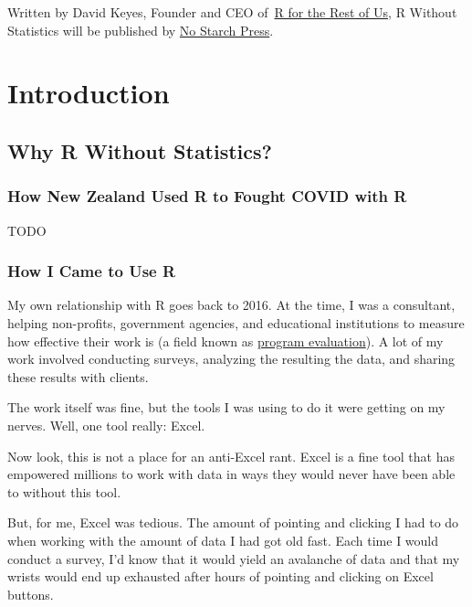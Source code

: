 \documentclass[
]{book}
\begin{document}
Written by David Keyes, Founder and CEO of~\href{https://rfortherestofus.com/}{R for the Rest of Us}, R Without Statistics will be published by \href{https://nostarch.com/}{No Starch Press}.

\hypertarget{part-introduction}{%
\part*{Introduction}\label{part-introduction}}

\hypertarget{why-r-without-statistics}{%
\chapter*{Why R Without Statistics?}\label{why-r-without-statistics}}

\hypertarget{how-new-zealand-used-r-to-fought-covid-with-r}{%
\section*{How New Zealand Used R to Fought COVID with R}\label{how-new-zealand-used-r-to-fought-covid-with-r}}

TODO

\hypertarget{how-i-came-to-use-r}{%
\section*{How I Came to Use R}\label{how-i-came-to-use-r}}

My own relationship with R goes back to 2016. At the time, I was a consultant, helping non-profits, government agencies, and educational institutions to measure how effective their work is (a field known as \href{https://www.cdc.gov/evaluation/index.htm}{program evaluation}). A lot of my work involved conducting surveys, analyzing the resulting the data, and sharing these results with clients.

The work itself was fine, but the tools I was using to do it were getting on my nerves. Well, one tool really: Excel.

Now look, this is not a place for an anti-Excel rant. Excel is a fine tool that has empowered millions to work with data in ways they would never have been able to without this tool.

But, for me, Excel was tedious. The amount of pointing and clicking I had to do when working with the amount of data I had got old fast. Each time I would conduct a survey, I'd know that it would yield an avalanche of data and that my wrists would end up exhausted after hours of pointing and clicking on Excel buttons.
\end{document}
